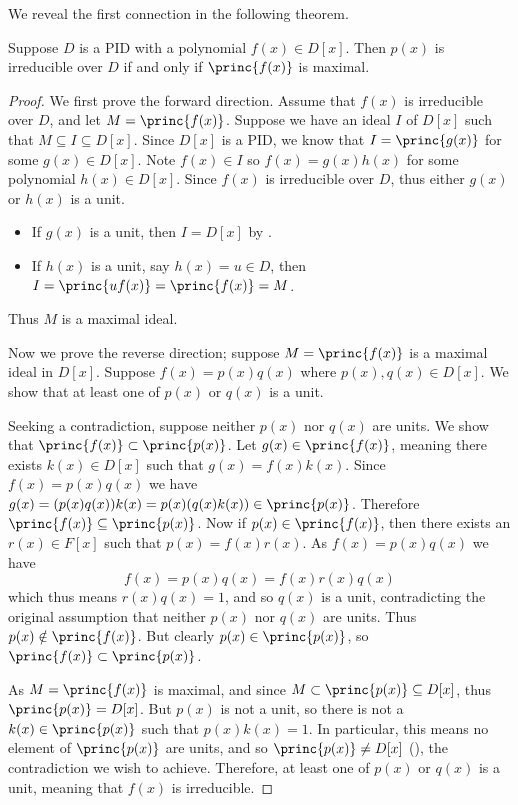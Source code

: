 We reveal the first connection in the following theorem.

\begin{theorem}\label{thrm-irreducible-iff-principal-ideal-is-maximal}
    Suppose $D$ is a PID with a polynomial $f(x) \in D[x]$. Then $p(x)$ is irreducible over $D$ if and only if $\princ{f(x)}$ is maximal.
\end{theorem}
\begin{proof}
    We first prove the forward direction. Assume that $f(x)$ is irreducible over $D$, and let $M = \princ{f(x)}$. Suppose we have an ideal $I$ of $D[x]$ such that $M \subseteq I \subseteq D[x]$. Since $D[x]$ is a PID, we know that $I = \princ{g(x)}$ for some $g(x) \in D[x]$. Note $f(x) \in I$ so $f(x) = g(x)h(x)$ for some polynomial $h(x) \in D[x]$. Since $f(x)$ is irreducible over $D$, thus either $g(x)$ or $h(x)$ is a unit.
    \begin{itemize}
        \item If $g(x)$ is a unit, then $I = D[x]$ by .
        \item If $h(x)$ is a unit, say $h(x) = u \in D$, then $I = \princ{uf(x)} = \princ{f(x)} = M$.
    \end{itemize}
    Thus $M$ is a maximal ideal.

    Now we prove the reverse direction; suppose $M = \princ{f(x)}$ is a maximal ideal in $D[x]$. Suppose $f(x) = p(x)q(x)$ where $p(x), q(x) \in D[x]$. We show that at least one of $p(x)$ or $q(x)$ is a unit.
    
    Seeking a contradiction, suppose neither $p(x)$ nor $q(x)$ are units. We show that $\princ{f(x)} \subset \princ{p(x)}$. Let $g(x) \in \princ{f(x)}$, meaning there exists $k(x) \in D[x]$ such that $g(x) = f(x)k(x)$. Since $f(x) = p(x)q(x)$ we have $g(x) = (p(x)q(x))k(x) = p(x)(q(x)k(x)) \in \princ{p(x)}$. Therefore $\princ{f(x)} \subseteq \princ{p(x)}$. Now if $p(x) \in \princ{f(x)}$, then there exists an $r(x) \in F[x]$ such that $p(x) = f(x)r(x)$. As $f(x) = p(x)q(x)$ we have
    \[
        f(x) = p(x)q(x) = f(x)r(x)q(x)
    \]
    which thus means $r(x)q(x) = 1$, and so $q(x)$ is a unit, contradicting the original assumption that neither $p(x)$ nor $q(x)$ are units. Thus $p(x) \notin \princ{f(x)}$. But clearly $p(x) \in \princ{p(x)}$, so $\princ{f(x)} \subset \princ{p(x)}$.

    As $M = \princ{f(x)}$ is maximal, and since $M \subset \princ{p(x)} \subseteq D[x]$, thus $\princ{p(x)} = D[x]$. But $p(x)$ is not a unit, so there is not a $k(x) \in \princ{p(x)}$ such that $p(x)k(x) = 1$. In particular, this means no element of $\princ{p(x)}$ are units, and so $\princ{p(x)} \neq D[x]$ (), the contradiction we wish to achieve. Therefore, at least one of $p(x)$ or $q(x)$ is a unit, meaning that $f(x)$ is irreducible.
\end{proof}

